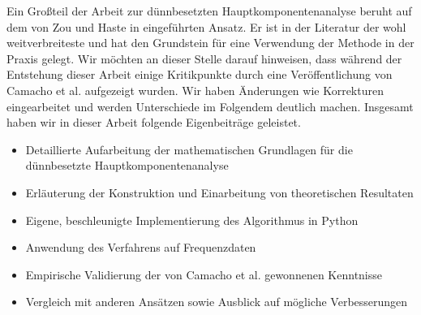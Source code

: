Ein Großteil der Arbeit zur dünnbesetzten Hauptkomponentenanalyse beruht auf dem von Zou und Haste in \cite{zou_sparsepca} eingeführten Ansatz. Er ist in der Literatur der wohl weitverbreiteste und hat den Grundstein für eine Verwendung der Methode in der Praxis gelegt. Wir möchten an dieser Stelle darauf hinweisen, dass während der Entstehung dieser Arbeit einige Kritikpunkte durch eine Veröffentlichung von Camacho et al. aufgezeigt wurden. Wir haben Änderungen wie Korrekturen eingearbeitet und werden Unterschiede im Folgendem deutlich machen. Insgesamt haben wir in dieser Arbeit folgende Eigenbeiträge geleistet.
\begin{itemize}
\item Detaillierte Aufarbeitung der mathematischen Grundlagen für die dünnbesetzte Hauptkomponentenanalyse
\item Erläuterung der Konstruktion und Einarbeitung von theoretischen Resultaten
\item Eigene, beschleunigte Implementierung des Algorithmus in Python
\item Anwendung des Verfahrens auf Frequenzdaten
\item Empirische Validierung der von Camacho et al. gewonnenen Kenntnisse
\item Vergleich mit anderen Ansätzen sowie Ausblick auf mögliche Verbesserungen
\end{itemize}